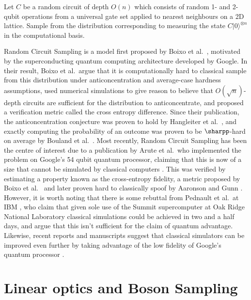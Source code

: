 \begin{problem} Let $C$ be a random circuit of depth $O(n)$ which consists of random 1- and 2-qubit operations from a universal gate set applied to nearest neighbours on a 2D lattice. Sample from the distribution corresponding to measuring the state $C|0\rangle^{\otimes n}$ in the computational basis.
\end{problem}

Random Circuit Sampling is a model first proposed by Boixo et al.~\cite{boixo2018}, motivated by the superconducting quantum computing architecture developed by Google. In their result, Boixo et al.\ argue that it is computationally hard to classical sample from this distribution under anticoncentration and average-case hardness assumptions, used numerical simulations to give reason to believe that $O(\sqrt{n})$-depth circuits are sufficient for the distribution to anticoncentrate, and proposed a verification metric called the cross entropy difference. Since their publication, the anticoncentration conjecture was proven to hold by Hangleiter et al.~\cite{hangleiter2018}, and exactly computing the probability of an outcome was proven to be $\sharpp$-hard on average by Bouland et al.~\cite{bouland2018}. Most recently, Random Circuit Sampling has been the centre of interest due to a publication by Arute et al.\ who implemented the problem on Google's 54 qubit quantum processor, claiming that this is now of a size that cannot be simulated by classical computers \cite{arute2019}. This was verified by estimating a property known as the cross-entropy fidelity, a metric proposed by Boixo et al.~\cite{boixo2018} and later proven hard to classically spoof by Aaronson and Gunn \cite{aaronson2019}. However, it is worth noting that there is some rebuttal from Pednault et al.\ at IBM \cite{pednault2019}, who claim that given sole use of the Summit supercomputer at Oak Ridge National Laboratory classical simulations could be achieved in two and a half days, and argue that this isn't sufficient for the claim of quantum advantage. Likewise, recent reports and manuscripts suggest that classical simulators can be improved even further by taking advantage of the low fidelity of Google's quantum processor \cite{morimae2019google, zhou2020}.

\section{Linear optics and Boson Sampling}
\label{sec:lo-bs}

